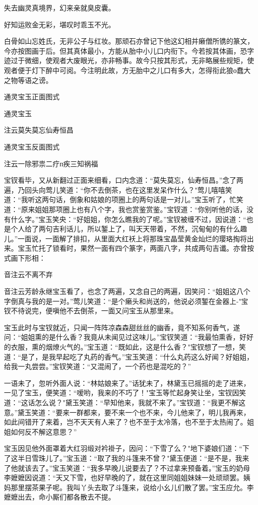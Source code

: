 失去幽灵真境界，幻来亲就臭皮囊。

好知运败金无彩，堪叹时乖玉不光。

白骨如山忘姓氏，无非公子与红妆。那顽石亦曾记下他这幻相并癞僧所镌的篆文，今亦按图画于后。但其真体最小，方能从胎中小儿口内衔下。今若按其体画，恐字迹过于微细，使观者大废眼光，亦非畅事。故今只按其形式，无非略展些规矩，使观者便于灯下醉中可阅。今注明此故，方无胎中之儿口有多大，怎得衔此狼о蠢大之物等语之谤。

通灵宝玉正面图式

通灵宝玉

注云莫失莫忘仙寿恒昌

通灵宝玉反面图式

注云一除邪祟二疗п疾三知祸福

宝钗看毕，又从新翻过正面来细看，口内念道：“莫失莫忘，仙寿恒昌。”念了两遍，乃回头向莺儿笑道：“你不去倒茶，也在这里发呆作什么？"莺儿嘻嘻笑道：“我听这两句话，倒象和姑娘的项圈上的两句话是一对儿。”宝玉听了，忙笑道：“原来姐姐那项圈上也有八个字，我也赏鉴赏鉴。”宝钗道：“你别听他的话，没有什么字。”宝玉笑央：“好姐姐，你怎么瞧我的了呢。”宝钗被缠不过，因说道：“也是个人给了两句吉利话儿，所以錾上了，叫天天带着，不然，沉甸甸的有什么趣儿。”一面说，一面解了排扣，从里面大红袄上将那珠宝晶莹黄金灿烂的璎珞掏将出来。宝玉忙托了锁看时，果然一面有四个篆字，两面八字，共成两句吉谶。亦曾按式画下形相：

音注云不离不弃

音注云芳龄永继宝玉看了，也念了两遍，又念自己的两遍，因笑问：“姐姐这八个字倒真与我的是一对。”莺儿笑道：“是个癞头和尚送的，他说必须錾在金器上-"宝钗不待说完，便嗔他不去倒茶，一面又问宝玉从那里来。

宝玉此时与宝钗就近，只闻一阵阵凉森森甜丝丝的幽香，竟不知系何香气，遂问：“姐姐熏的是什么香？我竟从未闻见过这味儿。”宝钗笑道：“我最怕熏香，好好的衣服，熏的烟燎火气的。”宝玉道：“既如此，这是什么香？"宝钗想了一想，笑道：“是了，是我早起吃了丸药的香气。”宝玉笑道：“什么丸药这么好闻？好姐姐，给我一丸尝尝。”宝钗笑道：“又混闹了，一个药也是混吃的？”

一语未了，忽听外面人说：“林姑娘来了。”话犹未了，林黛玉已摇摇的走了进来，一见了宝玉，便笑道：“嗳哟，我来的不巧了！"宝玉等忙起身笑让坐，宝钗因笑道：“这话怎么说？"黛玉笑道：“早知他来，我就不来了。”宝钗道：“我更不解这意。”黛玉笑道：“要来一群都来，要不来一个也不来，今儿他来了，明儿我再来，如此间错开了来着，岂不天天有人来了？也不至于太冷落，也不至于太热闹了。姐姐如何反不解这意思？”

宝玉因见他外面罩着大红羽缎对衿褂子，因问：“下雪了么？"地下婆娘们道：“下了这半日雪珠儿了。”宝玉道：“取了我的斗篷来不曾？"黛玉便道：“是不是，我来了他就该去了。”宝玉笑道：“我多早晚儿说要去了？不过拿来预备着。”宝玉的奶母李嬷嬷因说道：“天又下雪，也好早晚的了，就在这里同姐姐妹妹一处顽顽罢。姨妈那里摆茶果子呢。我叫丫头去取了斗篷来，说给小幺儿们散了罢。”宝玉应允。李嬷嬷出去，命小厮们都各散去不提。

